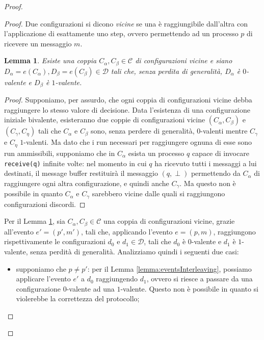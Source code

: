 \documentclass{article}
\newtheorem{lemma}{Lemma}
\begin{document}
\begin{proof}
\begin{proof}
Due configurazioni si dicono \emph{vicine} se una è raggiungibile
dall'altra con l'applicazione di esattamente uno step, ovvero
permettendo ad un processo $p$ di ricevere un messaggio $m$.

\begin{lemma}
  \label{lemma:neighborsConfigsYieldDiscordingConfigs}
  Esiste una coppia $C_{\alpha}, C_{\beta} \in \mathcal{C}$ di
  configurazioni vicine e siano $D_{\alpha} = e(C_{\alpha}), D_{\beta}
  = e (C_{\beta})\in \mathcal{D}$ tali che, senza perdita di
  generalit\`a, $D_{\alpha}$ \`e $0$-valente e $D_{\beta}$ \`e
  $1$-valente.
\end{lemma}
\begin{proof}
  Supponiamo, per assurdo, che ogni coppia di configurazioni vicine
  debba raggiungere lo stesso valore di decisione. Data l'esistenza di
  una configurazione iniziale bivalente, esisteranno due coppie di
  configurazioni vicine $(C_{\alpha}, C_{\beta})$ e $(C_{\gamma},
  C_{\eta})$ tali che $C_{\alpha}$ e $C_{\beta}$ sono, senza perdere
  di generalit\`a, $0$-valenti mentre $C_{\gamma}$ e $C_{\eta}$
  $1$-valenti. Ma dato che i run necessari per raggiungere ognuna di
  esse sono run ammissibili, supponiamo che in $C_{\alpha}$ esista un
  processo $q$ capace di invocare \texttt{receive(q)} infinite volte:
  nel momento in cui $q$ ha ricevuto tutti i messaggi a lui destinati,
  il message buffer restituir\`a il messaggio $(q, \perp)$ permettendo
  da $C_{\alpha}$ di raggiungere ogni altra configurazione, e quindi
  anche $C_{\gamma}$. Ma questo non \`e possibile in quanto
  $C_{\alpha}$ e $C_{\gamma}$ sarebbero vicine dalle quali si
  raggiungono configurazioni discordi.
\end{proof}



Per il Lemma \ref{lemma:neighborsConfigsYieldDiscordingConfigs}, sia
$C_{\alpha}, C_{\beta} \in \mathcal{C}$ una coppia di configurazioni
vicine, grazie all'evento $e'=(p',m')$, tali che, applicando l'evento
$e=(p,m)$, raggiungono rispettivamente le configurazioni $d_0$ e $d_1
\in \mathcal{D}$, tali che $d_{0}$ \`e $0$-valente e $d_{1}$ \`e
$1$-valente, senza perdit\`a di generalit\`a. Analizziamo quindi i
seguenti due casi:
\begin{itemize}
\item supponiamo che $p \neq p'$: per il Lemma
  \ref{lemma:eventsInterleaving}, possiamo applicare l'evento $e'$ a
  $d_0$ raggiungendo $d_1$, ovvero si riesce a passare da una
  configurazione $0$-valente ad una $1$-valente. Questo non \`e
  possibile in quanto si violerebbe la correttezza del protocollo;


\end{itemize}
\end{proof}
\end{proof}
\end{document}
